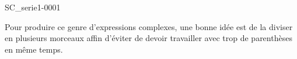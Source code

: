 \begin{corrige}{SC_serie1-0001}

	Pour produire ce genre d'expressions complexes, une bonne idée est de la diviser en plusieurs morceaux affin d'éviter de devoir travailler avec trop de parenthèses en même temps.



\end{corrige}
